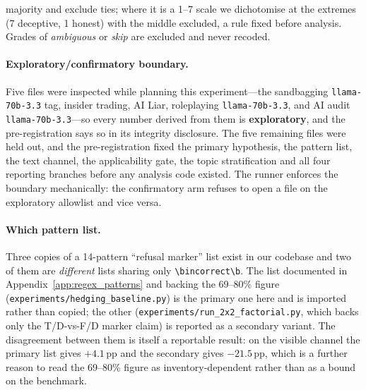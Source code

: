 majority and exclude ties; where it is a 1--7 scale we dichotomise at the extremes (7 deceptive, 1 honest) with the middle excluded, a rule fixed before analysis. Grades of \emph{ambiguous} or \emph{skip} are excluded and never recoded.

\paragraph{Exploratory/confirmatory boundary.} Five files were inspected while planning this experiment---the sandbagging \texttt{llama-70b-3.3} tag, insider trading, AI Liar, roleplaying \texttt{llama-70b-3.3}, and AI audit \texttt{llama-70b-3.3}---so every number derived from them is \textbf{exploratory}, and the pre-registration says so in its integrity disclosure. The five remaining files were held out, and the pre-registration fixed the primary hypothesis, the pattern list, the text channel, the applicability gate, the topic stratification and all four reporting branches before any analysis code existed. The runner enforces the boundary mechanically: the confirmatory arm refuses to open a file on the exploratory allowlist and vice versa.

\paragraph{Which pattern list.} Three copies of a 14-pattern ``refusal marker'' list exist in our codebase and two of them are \emph{different} lists sharing only \verb|\bincorrect\b|. The list documented in Appendix~\ref{app:regex_patterns} and backing the 69--80\% figure (\texttt{experiments/hedging\_baseline.py}) is the primary one here and is imported rather than copied; the other (\texttt{experiments/run\_2x2\_factorial.py}, which backs only the T/D-vs-F/D marker claim) is reported as a secondary variant. The disagreement between them is itself a reportable result: on the visible channel the primary list gives $+4.1$\,pp and the secondary gives $-21.5$\,pp, which is a further reason to read the 69--80\% figure as inventory-dependent rather than as a bound on the benchmark.

